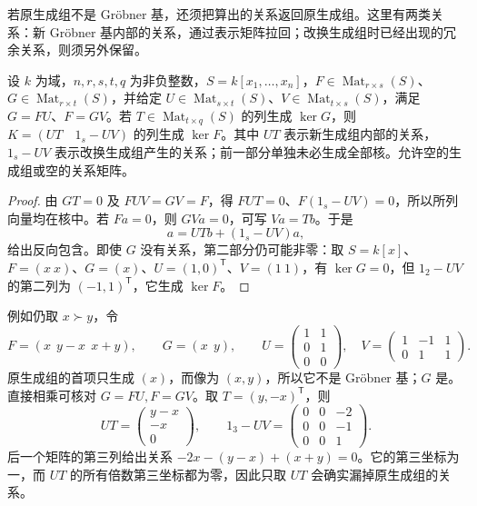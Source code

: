 \ProseParagraphBreak
若原生成组不是 Gröbner 基，还须把算出的关系返回原生成组。这里有两类关系：新 Gröbner 基内部的关系，通过表示矩阵拉回；改换生成组时已经出现的冗余关系，则须另外保留。

\begin{proposition}\label{b3:prop:kernel-generator-change}
	设 \(k\) 为域，\(n,r,s,t,q\) 为非负整数，\(S=k[x_1,\ldots,x_n]\)，\(F\in\operatorname{Mat}_{r\times s}(S)\)、\(G\in\operatorname{Mat}_{r\times t}(S)\)，并给定 \(U\in\operatorname{Mat}_{s\times t}(S)\)、\(V\in\operatorname{Mat}_{t\times s}(S)\)，满足 \(G=FU\)、\(F=GV\)。若 \(T\in\operatorname{Mat}_{t\times q}(S)\) 的列生成 \(\ker G\)，则 \(K=(UT\quad 1_s-UV)\) 的列生成 \(\ker F\)。其中 \(UT\) 表示新生成组内部的关系，\(1_s-UV\) 表示改换生成组产生的关系；前一部分单独未必生成全部核。允许空的生成组或空的关系矩阵。
\end{proposition}
\begin{proof}
	由 \(GT=0\) 及 \(FUV=GV=F\)，得 \(FUT=0\)、\(F(1_s-UV)=0\)，所以所列向量均在核中。若 \(Fa=0\)，则 \(GVa=0\)，可写 \(Va=Tb\)。于是
	\[
		a=UTb+(1_s-UV)a,
	\]
	给出反向包含。即使 \(G\) 没有关系，第二部分仍可能非零：取 \(S=k[x]\)、\(F=(x\ x)\)、\(G=(x)\)、\(U=(1,0)^{\mathsf T}\)、\(V=(1\ 1)\)，有 \(\ker G=0\)，但 \(1_2-UV\) 的第二列为 \((-1,1)^{\mathsf T}\)，它生成 \(\ker F\)。
\end{proof}

\ProseParagraphBreak
例如仍取 \(x\succ y\)，令
\[
	F=(x\ \ y-x\ \ x+y),\qquad G=(x\ \ y),\qquad
	U=\begin{pmatrix}1&1\\0&1\\0&0\end{pmatrix},\quad
	V=\begin{pmatrix}1&-1&1\\0&1&1\end{pmatrix}.
\]
原生成组的首项只生成 \((x)\)，而像为 \((x,y)\)，所以它不是 Gröbner 基；\(G\) 是。直接相乘可核对 \(G=FU,F=GV\)。取 \(T=(y,-x)^{\mathsf T}\)，则
\[
	UT=\begin{pmatrix}y-x\\-x\\0\end{pmatrix},\qquad
	1_3-UV=\begin{pmatrix}0&0&-2\\0&0&-1\\0&0&1\end{pmatrix}.
\]
后一个矩阵的第三列给出关系 \(-2x-(y-x)+(x+y)=0\)。它的第三坐标为一，而 \(UT\) 的所有倍数第三坐标都为零，因此只取 \(UT\) 会确实漏掉原生成组的关系。

